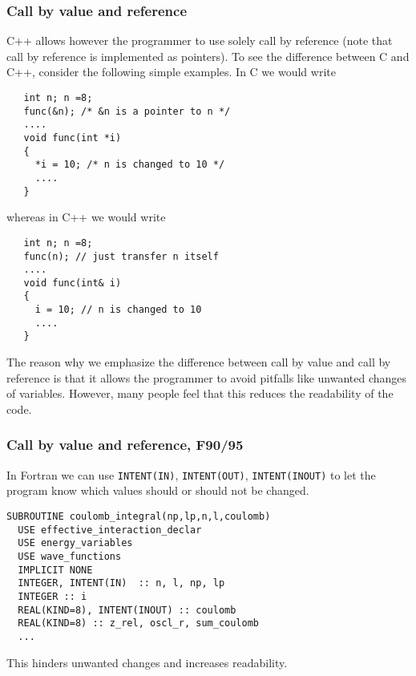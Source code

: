 \documentclass{beamer}
\begin{document}
\begin{frame}
\frametitle{Call by value and reference}

C++ allows however the programmer to use solely call by reference
(note that call by reference is implemented as pointers).
To see the difference between C and C++, consider the following simple
examples. In C we would write

\begin{verbatim}
   int n; n =8;
   func(&n); /* &n is a pointer to n */
   ....
   void func(int *i)
   {
     *i = 10; /* n is changed to 10 */
     ....
   }
\end{verbatim}

whereas in C++ we would write

\begin{verbatim}
   int n; n =8;
   func(n); // just transfer n itself
   ....
   void func(int& i)
   {
     i = 10; // n is changed to 10
     ....
   }
\end{verbatim}
The reason why we emphasize the difference between call by value and call
by reference is that it allows the programmer to avoid pitfalls
like unwanted changes of variables. However, many people feel that this
reduces the readability of the code.
\end{frame}

\begin{frame}
\frametitle{Call by value and reference, F90/95}

In Fortran we can use \Verb!INTENT(IN)!, \Verb!INTENT(OUT)!, \Verb!INTENT(INOUT)! to let the
program know which values should or should not be changed.

\begin{verbatim}
SUBROUTINE coulomb_integral(np,lp,n,l,coulomb)
  USE effective_interaction_declar
  USE energy_variables
  USE wave_functions
  IMPLICIT NONE
  INTEGER, INTENT(IN)  :: n, l, np, lp
  INTEGER :: i
  REAL(KIND=8), INTENT(INOUT) :: coulomb
  REAL(KIND=8) :: z_rel, oscl_r, sum_coulomb
  ...
\end{verbatim}
This hinders unwanted changes and increases readability.
\end{frame}
\end{document}

